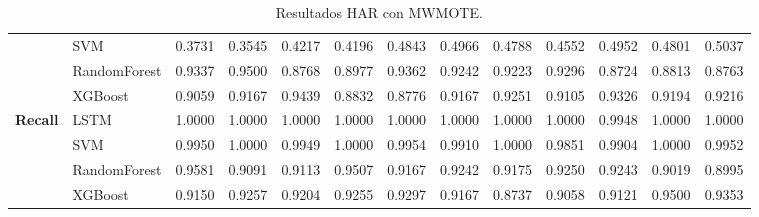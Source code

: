 \begin{table}[h]
\begin{adjustbox}{max width=15cm}
\begin{tabular}{|c|l|r|r|r|r|r|r|r|r|r|r|r|}
			& SVM &  0.3731 &  0.3545 &  0.4217 &  0.4196 &  0.4843 &  0.4966 &  0.4788 &  0.4552 &  0.4952 &  0.4801 &  0.5037 \\
			& RandomForest &  0.9337 &  0.9500 &  0.8768 &  0.8977 &  0.9362 &  0.9242 &  0.9223 &  0.9296 &  0.8724 &  0.8813 &  0.8763 \\
			& XGBoost &  0.9059 &  0.9167 &  0.9439 &  0.8832 &  0.8776 &  0.9167 &  0.9251 &  0.9105 &  0.9326 &  0.9194 &  0.9216 \\
			\hline
			\textbf{Recall} & LSTM &  1.0000 &  1.0000 &  1.0000 &  1.0000 &  1.0000 &  1.0000 &  1.0000 &  1.0000 &  0.9948 &  1.0000 &  1.0000 \\
			& SVM &  0.9950 &  1.0000 &  0.9949 &  1.0000 &  0.9954 &  0.9910 &  1.0000 &  0.9851 &  0.9904 &  1.0000 &  0.9952 \\
			& RandomForest &  0.9581 &  0.9091 &  0.9113 &  0.9507 &  0.9167 &  0.9242 &  0.9175 &  0.9250 &  0.9243 &  0.9019 &  0.8995 \\
			& XGBoost &  0.9150 &  0.9257 &  0.9204 &  0.9255 &  0.9297 &  0.9167 &  0.8737 &  0.9058 &  0.9121 &  0.9500 &  0.9353 \\
			\hline
		\end{tabular}
	\end{adjustbox}
	\caption{Resultados HAR con MWMOTE.}
	\label{tab:HAR_MWMOTE}
\end{table}

